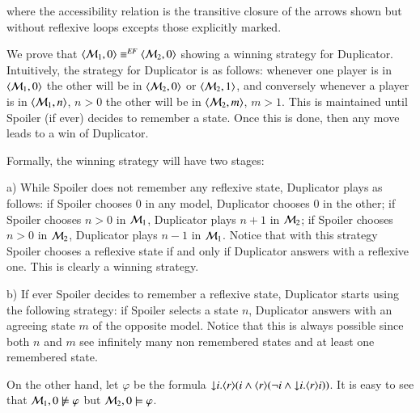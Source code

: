 \begin{pf}
\begin{center}
\hspace{10mm}
\end{center}

\noindent where the accessibility relation is the
transitive closure of the arrows shown but without reflexive
loops excepts those explicitly marked.


We prove that $\langle \mathcal{M}_1,0 \rangle\equiv^{\mathit{EF}} \langle \mathcal{M}_2,0 \rangle$
showing a winning strategy for Duplicator. Intuitively, the strategy
for Duplicator is as follows: whenever one player is in
$\langle \mathcal{M}_1,0 \rangle$ the other will be in $\langle \mathcal{M}_2,0 \rangle$ or
$\langle \mathcal{M}_2,1 \rangle$, and conversely whenever a player is in
$\langle \mathcal{M}_1,n \rangle$, $n>0$ the other will be in $\langle \mathcal{M}_2,m \rangle$,
$m>1$. This is maintained until Spoiler (if ever) decides to
remember a state. Once this is done, then any move leads to a win of
Duplicator.

Formally, the winning strategy will have two stages:
\smallskip

\noindent
a) While Spoiler does not remember any reflexive
state, Duplicator plays as follows: if Spoiler
chooses $0$ in any model, Duplicator chooses $0$ in the other;
if Spoiler chooses $n>0$ in $\mathcal{M}_1$, Duplicator plays $n+1$ in
$\mathcal{M}_2$; if Spoiler chooses $n>0$ in $\mathcal{M}_2$, Duplicator plays
$n-1$ in $\mathcal{M}_1$. Notice that with this strategy Spoiler chooses
a reflexive state if and only if Duplicator answers with a reflexive
one. This is clearly a winning strategy.
\smallskip

\noindent
b) If ever Spoiler decides to
remember a reflexive state, Duplicator starts using the following
strategy: if Spoiler selects a state $n$, Duplicator answers with an
agreeing state $m$ of the opposite model. Notice that this is always
possible since both $n$ and $m$ see infinitely many non remembered
states and at least one remembered state.
\smallskip

\noindent
On the other hand, let $\varphi$ be the formula ${\downarrow} i. \langle r \rangle(i
\land \langle r \rangle(\lnot i \land {\downarrow} i.\langle r \rangle i))$. It is easy to see
that $\mathcal{M}_1, 0 \not \models \varphi$ but $\mathcal{M}_2, 0 \models
\varphi$.
\end{pf}

